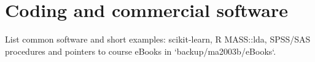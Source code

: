 \section{Coding and commercial software}

List common software and short examples: scikit-learn, R MASS::lda, SPSS/SAS procedures and pointers to course eBooks in `backup/ma2003b/eBooks`.
